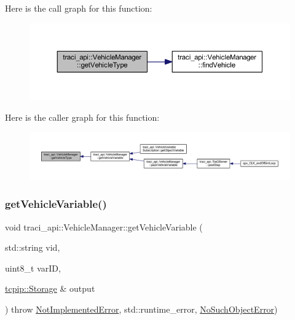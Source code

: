 Here is the call graph for this function\+:
\nopagebreak
\begin{figure}[H]
\begin{center}
\leavevmode
\includegraphics[width=350pt]{classtraci__api_1_1_vehicle_manager_a946553555fa7a2a9f95b4baced6f0dbe_cgraph}
\end{center}
\end{figure}
Here is the caller graph for this function\+:
\nopagebreak
\begin{figure}[H]
\begin{center}
\leavevmode
\includegraphics[width=350pt]{classtraci__api_1_1_vehicle_manager_a946553555fa7a2a9f95b4baced6f0dbe_icgraph}
\end{center}
\end{figure}
\mbox{\label{classtraci__api_1_1_vehicle_manager_a6926963a4f6914be50a1b75833574249}} 
\subsubsection{\texorpdfstring{get\+Vehicle\+Variable()}{getVehicleVariable()}}
{\footnotesize\ttfamily void traci\+\_\+api\+::\+Vehicle\+Manager\+::get\+Vehicle\+Variable (\begin{DoxyParamCaption}\item[{std\+::string}]{vid,  }\item[{uint8\+\_\+t}]{var\+ID,  }\item[{\hyperlink{classtcpip_1_1_storage}{tcpip\+::\+Storage} \&}]{output }\end{DoxyParamCaption}) throw  \hyperlink{classtraci__api_1_1_not_implemented_error}{Not\+Implemented\+Error},  std\+::runtime\+\_\+error, \hyperlink{classtraci__api_1_1_no_such_object_error}{No\+Such\+Object\+Error}) }

